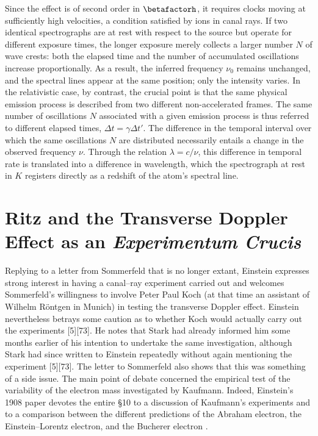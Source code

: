 \documentclass[pdflatex,sn-basic]{sn-jnl}
\newcommand{\tDe}{transverse Doppler effect\xspace}
\begin{document}
Since the effect is of second order in $\betafactorh$, it requires clocks moving at sufficiently high velocities, a condition satisfied by ions in canal rays. If two identical spectrographs are at rest with respect to the source but operate for different exposure times, the longer exposure merely collects a larger number $N$ of wave crests: both the elapsed time and the number of accumulated oscillations increase proportionally. As a result, the inferred frequency $\nu_0$ remains unchanged, and the spectral lines appear at the same position; only the intensity varies. In the relativistic case, by contrast, the crucial point is that the same physical emission process is described from two different non-accelerated frames. The same number of oscillations $N$ associated with a given emission process is thus referred to different elapsed times, $\Delta t=\gamma \Delta t'$. The difference in the temporal interval over which the same oscillations $N$ are distributed necessarily entails a change in the observed frequency $\nu$. Through the relation $\lambda = c/\nu$, this difference in temporal rate is translated into a difference in wavelength, which the spectrograph at rest in $K$ registers directly as a redshift of the atom’s spectral line.


\section{Ritz and the Transverse Doppler Effect as an \emph{Experimentum Crucis}}
%
Replying to a letter from Sommerfeld that is no longer extant, Einstein expresses strong interest in having a canal--ray experiment carried out and welcomes Sommerfeld’s willingness to involve Peter Paul Koch (at that time an assistant of Wilhelm Röntgen in Munich) in testing the \tDe. Einstein nevertheless betrays some caution as to whether Koch would actually carry out the experiments [5][73]. He notes that Stark had already informed him some months earlier of his intention to undertake the same investigation, although Stark had since written to Einstein repeatedly without again mentioning the experiment [5][73]. The letter to Sommerfeld also shows that this was something of a side issue. The main point of debate concerned the empirical test of the variability of the electron mass investigated by Kaufmann. Indeed, Einstein’s 1908 paper devotes the entire \S10 to a discussion of Kaufmann’s experiments and to a comparison between the different predictions of the Abraham electron, the Einstein--Lorentz electron, and the Bucherer electron \citep{Walter2018}. 
\end{document}
